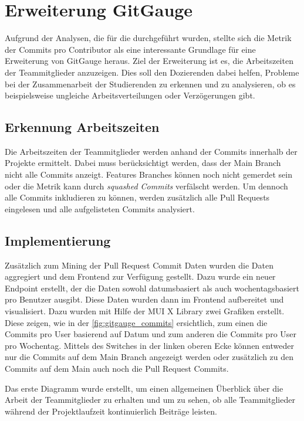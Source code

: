 \section{Erweiterung GitGauge}
Aufgrund der Analysen, die für die  durchgeführt wurden, stellte sich die Metrik der Commits pro Contributor als eine interessante Grundlage für eine Erweiterung von GitGauge heraus. 
Ziel der Erweiterung ist es, die Arbeitszeiten der Teammitglieder anzuzeigen. Dies soll den Dozierenden dabei helfen, Probleme bei der Zusammenarbeit der Studierenden zu erkennen und zu analysieren, ob es beispielsweise ungleiche Arbeitsverteilungen oder Verzögerungen gibt.

\subsection{Erkennung Arbeitszeiten}
Die Arbeitszeiten der Teammitglieder werden anhand der Commits innerhalb der Projekte ermittelt. Dabei muss berücksichtigt werden, dass der Main Branch nicht alle Commits anzeigt. Features Branches können noch nicht gemerdet sein oder die Metrik kann durch \textit{squashed Commits} verfälscht werden. Um dennoch alle Commits inkludieren zu können, werden zusätzlich alle Pull Requests eingelesen und alle aufgelisteten Commits analysiert. 

\subsection{Implementierung}
Zusätzlich zum Mining der Pull Request Commit Daten wurden die Daten aggregiert und dem Frontend zur Verfügung gestellt. Dazu wurde ein neuer Endpoint erstellt, der die Daten sowohl datumsbasiert als auch wochentagsbasiert pro Benutzer ausgibt. Diese Daten wurden dann im Frontend aufbereitet und visualisiert. Dazu wurden mit Hilfe der MUI X Library zwei Grafiken erstellt. Diese zeigen, wie in der \autoref{fig:gitgauge_commits} ersichtlich, zum einen die Commits pro User basierend auf Datum und zum anderen die Commits pro User pro Wochentag. Mittels des Switches in der linken oberen Ecke können entweder nur die Commits auf dem Main Branch angezeigt werden oder zusätzlich zu den Commits auf dem Main auch noch die Pull Request Commits.

Das erste Diagramm wurde erstellt, um einen allgemeinen Überblick über die Arbeit der Teammitglieder zu erhalten und um zu sehen, ob alle Teammitglieder während der Projektlaufzeit kontinuierlich Beiträge leisten.

